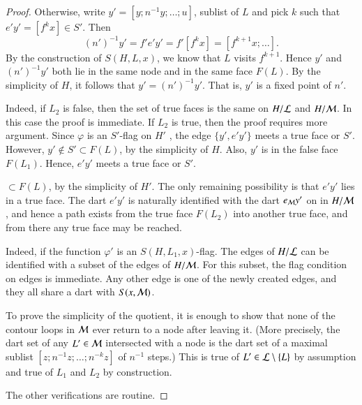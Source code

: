 \begin{proof}
  Otherwise,
write $y' = [y;n^{-1}y;\ldots;u]$, sublist of $L$ and pick $k$ such that $e'y' = [f^k x]\in S'$.
Then
\begin{displaymath}
(n')^{-1} y' = f'e'y' = f'[f^k x] = [f^{k+1}x;\ldots].
\end{displaymath}
By the construction of $S(H,L,x)$, we know that $L$ visits $f^{k+1}$.  Hence
$y'$ and $(n')^{-1}y'$ both lie in the same node and in the same face $F(L)$.  By
the simplicity of $H$,  it follows that $y' = (n')^{-1} y'$.  That is, $y'$ is a fixed point of $n'$.


   Indeed, if $L_2$ is false, then the set of true faces
is the same on $H/{\cal L}$ and $H/{\cal M}$.  In this case the proof
is immediate.  If $L_2$ is true, then the proof requires more
argument.  Since $\varphi$ is
an $S'$-flag on $H'$ , the edge $\{y',e'y'\}$ meets a true face or
$S'$.  However, $y'\not\in S'\subset F(L)$, by the simplicity of $H$.
Also, $y'$ is in the false face $F(L_1)$.  Hence, $e'y'$ meets a true face or $S'$.


$\subset F(L)$, by the simplicity of $H'$.  The only
remaining possibility is that $e'y'$ lies in a true face.  The dart
$e'y'$ is naturally identified with the dart $e_{\cal M} y'$ on in
$H/{\cal M}$, and hence a path exists from the true face $F(L_2)$ into
another true face, and from there any true face may be reached.

   Indeed, if the
function $\varphi'$ is an $S(H,L_1,x)$-flag.  The edges of $H/{\cal
L}$ can be identified with a subset of the edges of $H/{\cal M}$.
For this subset, the flag condition on edges is immediate.  Any
other edge is one of the newly created edges, and they all share a
dart with $S(x,{\cal M})$.

 To prove the simplicity of the quotient, it is enough to show that
none of the contour
loops in ${\cal M}$  ever return to a node after leaving it.
 (More precisely, the dart set of any $L'\in{\cal M}$ intersected with a node
is the dart set of a maximal sublist $[z;n^{-1}z;\ldots;n^{-k}z]$ of $n^{-1}$ steps.)
This is true of $L'\in{\cal L}\setminus\{L\}$ by assumption and true of
$L_1$ and $L_2$ by construction.  

The other verifications are routine.
\end{proof}

